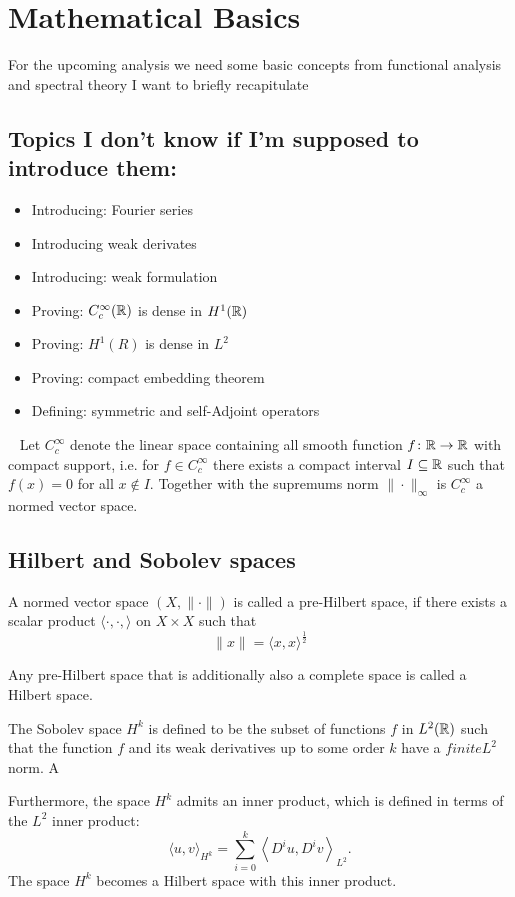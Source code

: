 \section*{Mathematical Basics}

For the upcoming analysis we need some basic concepts from functional analysis and spectral theory I want to briefly recapitulate

\subsection*{Topics I don't know if I'm supposed to introduce them:} 
\begin{itemize}
	\item Introducing: Fourier series
	\item Introducing weak derivates
	\item Introducing: weak formulation
	\item Proving: $C_{c}^{\infty}(\mathbb{R})$ is dense in $H^{1}(\mathbb{R})$
	\item Proving: $H^1(R)$ is dense in $L^2$
	\item Proving: compact embedding theorem
	\item Defining: symmetric and self-Adjoint operators 
\end{itemize}
~\newline
Let $C_{c}^{\infty}$ denote the linear space containing all smooth function $f \colon \mathbb{R} \rightarrow \mathbb{R}$ with compact support, i.e. for $f \in C_{c}^{\infty}$ there exists a compact interval $I \subseteq \mathbb{R}$ such that $f(x) = 0$ for all $x \notin I$. Together with the supremums norm $\| \cdot \|_{\infty}$ is $C_{c}^{\infty}$ a normed vector space.

\subsection*{Hilbert and Sobolev spaces}
A normed vector space $(X, \| \cdot \|)$ is called a pre-Hilbert space, if there exists a scalar product $\langle \cdot, \cdot, \rangle$ on $X \times X$ such that
	\[ \| x \| = \langle x, x \rangle^{\frac{1}{2}} \] 

Any pre-Hilbert space that is additionally also a complete space is called a Hilbert space.

The Sobolev space $H^{k}$ is defined to be the subset of functions $f$ in $L^{2}(\mathbb{R})$ such that the function $f$ and its weak derivatives up to some order $k$ have a $finite L^{2}$ norm. A

Furthermore, the space $H^{k}$ admits an inner product, which is defined in terms of the $L^2$ inner product: 
	\[ \langle u , v \rangle_{H^{k}} = \sum_{i=0}^{k} \left\langle D^{i}u , D^{i} v \right\rangle_{L^{2}}. \] 
The space $H^{k}$ becomes a Hilbert space with this inner product.

